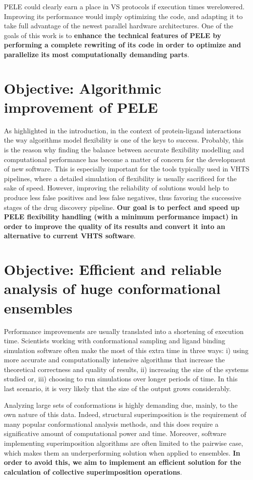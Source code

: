 PELE could clearly earn a place in VS protocols if execution times werelowered. Improving its performance would imply
optimizing the code, and adapting it to take full advantage of the newest parallel hardware architectures. One of the
goals of this work is to \textbf{enhance the technical features of PELE by performing a complete rewriting of its code in order to 
optimize and parallelize its most computationally demanding parts}. 

\section{Objective: Algorithmic improvement of PELE}

As highlighted in the introduction, in the context of protein-ligand interactions the way  algorithms model
flexibility is one of the keys to success. Probably, this is the reason why finding the balance between accurate
flexibility modelling and computational performance has become a matter of concern for the development of new software.
This is especially important for the tools typically used in VHTS pipelines, where a detailed simulation of flexibility
is usually sacrificed for the sake of speed. However, improving the reliability of solutions would help to produce less
false positives and less false negatives, thus favoring the successive stages of the drug discovery pipeline. \textbf{Our goal is to
perfect and speed up PELE flexibility handling (with a minimum performance impact) in order to improve the quality of its results and 
convert it into an alternative to current VHTS software}.

\section{Objective: Efficient and reliable analysis of huge conformational ensembles}

Performance improvements are usually translated into a shortening of execution time. Scientists working with
conformational sampling and ligand binding simulation software often make the most of this extra time in three ways:
i) using more accurate and computationally intensive algorithms that increase the theoretical correctness and quality
of results, ii) increasing the size of the systems studied or, iii) choosing to run simulations over longer
periods of time. In this last scenario, it is very likely that the size of the output grows considerably. 

Analyzing large sets of conformations is highly demanding due, mainly, to the own nature of this data. Indeed, structural superimposition
is the requirement of many popular conformational analysis methods, and this does require a significative amount of
computational power and time. Moreover, software implementing superimposition algorithms are often limited to the
pairwise case, which makes them an underperforming solution when applied to ensembles. \textbf{In order to avoid this, we aim
to implement an efficient solution for the calculation of collective superimposition operations}. 


